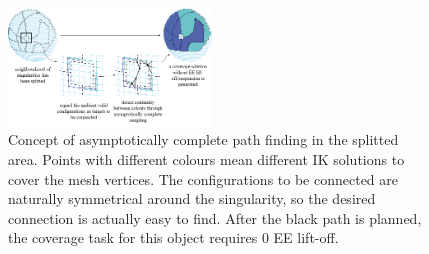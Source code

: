 \documentclass[Afour,sageh,times]{sagej}
\begin{document}
\begin{figure}[t]
\centering
\includegraphics[width = 0.48\textwidth]{figures/exp_central_sphere/complete_sampling/complete_sampling}
\caption{Concept of asymptotically complete path finding in the splitted area. Points with different colours mean different IK solutions to cover the mesh vertices. The configurations to be connected are naturally symmetrical around the singularity, so the desired connection is actually easy to find. After the black path is planned, the coverage task for this object requires $0$ EE lift-off. }\label{fig:complete_sampling}
\end{figure}
\end{document}
